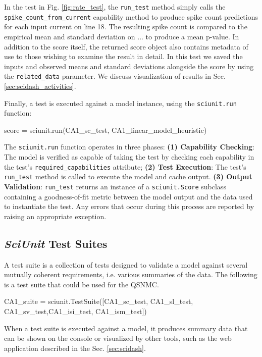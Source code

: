 \documentclass[11pt,letterpaper]{article}
\let\verbx\lstinline
\begin{document}
In the test in Fig. \ref{fig:rate_test}, the \verbx{run_test} method simply calls the \verbx{spike_count_from_current} capability method  to produce spike count predictions for each input current on line 18. The resulting spike count is compared to the empirical mean and standard deviation on ... to produce a mean p-value. In addition to the score itself, the returned score object also contains metadata of use to those wishing to examine the result in detail. In this test we saved the inputs and observed means and standard deviations alongside the score by using the \verbx{related_data} parameter. We discuss visualization of results in Sec. \ref{sec:scidash_activities}.

Finally, a test is executed against a model instance, using the \verbx{sciunit.run} function:
\begin{python}
score = sciunit.run(CA1_sc_test, CA1_linear_model_heuristic)
\end{python}

The \verbx{sciunit.run} function operates in three phases: \textbf{(1) Capability Checking}: The model is verified as capable of taking the test by checking each capability in the test's \verbx{required_capabilities} attribute; \textbf{(2) Test Execution}: The test's \verbx{run_test} method is called to execute the model and cache output. \textbf{(3) Output Validation}: \verbx{run_test} returns an instance of a \verbx{sciunit.Score} subclass containing a goodness-of-fit metric between the model output and the data used to instantiate the test.  Any errors that occur during this process are reported by raising an appropriate exception.

\subsection{\textit{SciUnit} Test Suites}
A test suite is a collection of tests designed to validate a model against several mutually coherent requirements, i.e. various summaries of the data.  The following is a test suite that could be used for the QSNMC.  
\begin{python}
CA1_suite = sciunit.TestSuite([CA1_sc_test, CA1_sl_test, CA1_sv_test,CA1_isi_test, CA1_ism_test])
\end{python}
When a test suite is executed against a model, it produces summary data that can be shown on the console or visualized by other tools, such as the web application described in the Sec. \ref{sec:scidash}.
\end{document}
